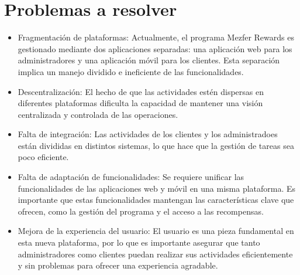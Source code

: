 \chapter{Problemas a resolver}
    \begin{itemize}
        \item Fragmentación de plataformas: Actualmente, el programa Mezfer Rewards es gestionado mediante dos aplicaciones separadas: una aplicación web para los administradores y una aplicación móvil para los clientes. Esta separación implica un manejo dividido e ineficiente de las funcionalidades.
        \item Descentralización: El hecho de que las actividades estén dispersas en diferentes plataformas dificulta la capacidad de mantener una visión centralizada y controlada de las operaciones.
        \item Falta de integración: Las actividades de los clientes y los administradoes están divididas en distintos sistemas, lo que hace que la gestión de tareas sea poco eficiente.
        \item Falta de adaptación de funcionalidades: Se requiere unificar las funcionalidades de las aplicaciones web y móvil en una misma plataforma. Es importante que estas funcionalidades mantengan las características clave que ofrecen, como la gestión del programa y el acceso a las recompensas.
        \item Mejora de la experiencia del usuario: El usuario es una pieza fundamental en esta nueva plataforma, por lo que es importante asegurar que tanto administradores como clientes puedan realizar sus actividades eficientemente y sin problemas para ofrecer una experiencia agradable.    
    \end{itemize}